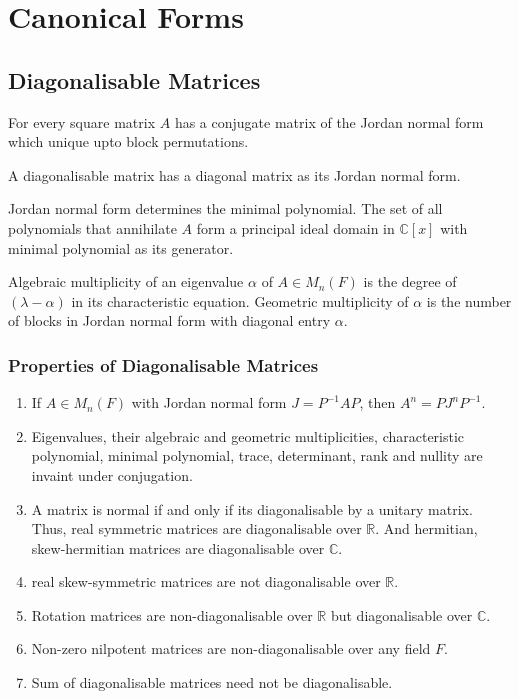 \chapter{Canonical Forms}
\section{Diagonalisable Matrices}
\begin{note}
	For every square matrix $A$ has a conjugate matrix of the Jordan normal form which unique upto block permutations.
\end{note}

\begin{definition}[diagonalisable]
	A diagonalisable matrix has a diagonal matrix as its Jordan normal form.
\end{definition}

\begin{note}
	Jordan normal form determines the minimal polynomial.
	The set of all polynomials that annihilate $A$ form a principal ideal domain in $\mathbb{C}[x]$ with minimal polynomial as its generator.
\end{note}

\begin{definition}[multiplicity]
	Algebraic multiplicity of an eigenvalue $\alpha$ of $A \in M_n(F)$ is the degree of $(\lambda-\alpha)$ in its characteristic equation.
	Geometric multiplicity of $\alpha$ is the number of blocks in Jordan normal form with diagonal entry $\alpha$.
\end{definition}

\subsection{Properties of Diagonalisable Matrices}
\begin{enumerate}
	\item If $A \in M_n(F)$ with Jordan normal form $J = P^{-1}AP$, then $A^n = PJ^nP^{-1}$.
	\item Eigenvalues, their algebraic and geometric multiplicities, characteristic polynomial, minimal polynomial, trace, determinant, rank and nullity are invaint under conjugation.
	\item A matrix is normal if and only if its diagonalisable by a unitary matrix.
		Thus, real symmetric matrices are diagonalisable over $\mathbb{R}$.
		And hermitian, skew-hermitian matrices are diagonalisable over $\mathbb{C}$.
	\item real skew-symmetric matrices are not diagonalisable over $\mathbb{R}$.
	\item Rotation matrices are non-diagonalisable over $\mathbb{R}$ but diagonalisable over $\mathbb{C}$.
	\item Non-zero nilpotent matrices are non-diagonalisable over any field $F$.
	\item Sum of diagonalisable matrices need not be diagonalisable.
\end{enumerate}

